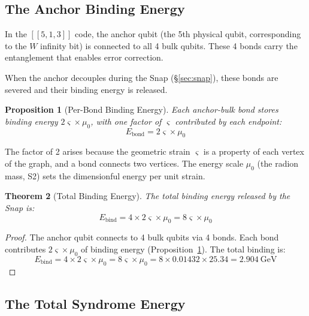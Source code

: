\documentclass[11pt,a4paper]{article}
\newtheorem{theorem}{Theorem}[section]
\newtheorem{proposition}[theorem]{Proposition}
\theoremstyle{definition}
\theoremstyle{remark}
\newcommand{\strain}{\varsigma}
\newcommand{\murad}{\mu_0}
\begin{document}
\subsection{The Anchor Binding Energy}

In the $[[5,1,3]]$ code, the anchor qubit (the 5th physical qubit, corresponding to the $W$ infinity bit) is connected to all 4 bulk qubits. These 4 bonds carry the entanglement that enables error correction.

When the anchor decouples during the Snap (\S\ref{sec:snap}), these bonds are severed and their binding energy is released.

\begin{proposition}[Per-Bond Binding Energy]
\label{prop:bond}
Each anchor-bulk bond stores binding energy $2\strain \times \murad$, with one factor of $\strain$ contributed by each endpoint:
\begin{equation}
E_{\mathrm{bond}} = 2\strain \times \murad
\end{equation}
\end{proposition}

The factor of 2 arises because the geometric strain $\strain$ is a property of each vertex of the graph, and a bond connects two vertices. The energy scale $\murad$ (the radion mass, S2) sets the dimensionful energy per unit strain.

\begin{theorem}[Total Binding Energy]
\label{thm:bind}
The total binding energy released by the Snap is:
\begin{equation}
E_{\mathrm{bind}} = 4 \times 2\strain \times \murad = 8\strain \times \murad
\end{equation}
\end{theorem}

\begin{proof}
The anchor qubit connects to 4 bulk qubits via 4 bonds. Each bond contributes $2\strain \times \murad$ of binding energy (Proposition~\ref{prop:bond}). The total binding is:
\begin{equation}
E_{\mathrm{bind}} = 4 \times 2\strain \times \murad = 8\strain \times \murad = 8 \times 0.01432 \times 25.34 = 2.904~\text{GeV}
\end{equation}
\end{proof}

\subsection{The Total Syndrome Energy}
\end{document}
